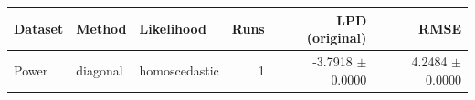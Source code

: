\begin{tabular}{lllrrr}
\toprule
Dataset & Method & Likelihood & Runs & LPD (original) & RMSE \\
\midrule
Power & diagonal & homoscedastic & 1 & -3.7918 $\pm$ 0.0000 & 4.2484 $\pm$ 0.0000 \\
\bottomrule
\end{tabular}
